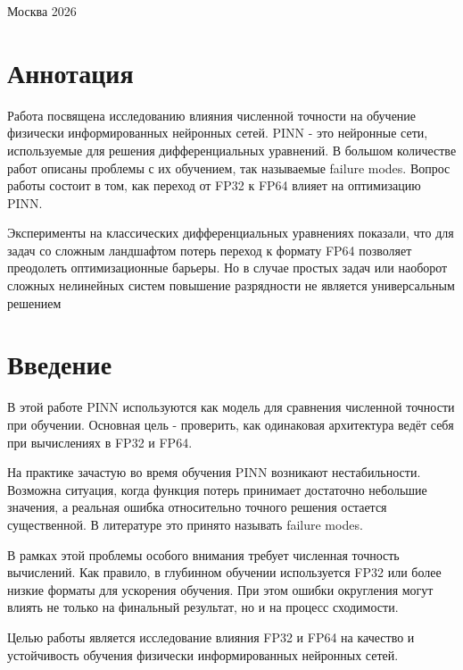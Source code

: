 \documentclass[14pt,a4paper]{extarticle}
\begin{document}
\begin{center}
Москва 2026
\end{center}

\endgroup

\clearpage


\tableofcontents
\clearpage


\section*{Аннотация}

{Работа посвящена исследованию влияния численной точности на обучение физически информированных нейронных сетей. PINN - это нейронные сети, используемые для решения дифференциальных уравнений. В большом количестве работ описаны проблемы с их обучением, так называемые failure modes. Вопрос работы состоит в том, как переход от FP32 к FP64 влияет на оптимизацию PINN. }

Эксперименты на классических дифференциальных уравнениях показали, что для задач со сложным ландшафтом потерь переход к формату FP64 позволяет преодолеть оптимизационные барьеры. Но в случае простых задач или наоборот сложных нелинейных систем повышение разрядности не является универсальным решением

\clearpage

\section{Введение}

В этой работе PINN используются как модель для сравнения численной точности при обучении. Основная цель - проверить, как одинаковая архитектура ведёт себя при вычислениях в FP32 и FP64.

На практике зачастую во время обучения PINN возникают нестабильности. Возможна ситуация, когда функция потерь принимает достаточно небольшие значения, а реальная ошибка относительно точного решения остается существенной. В литературе это принято называть failure modes. 

В рамках этой проблемы особого внимания требует численная точность вычислений. Как правило, в глубинном обучении используется FP32 или более низкие форматы для ускорения обучения. При этом ошибки округления могут влиять не только на финальный результат, но и на процесс сходимости.

Целью работы является исследование влияния FP32 и FP64 на качество и устойчивость обучения физически информированных нейронных сетей.
\end{document}
